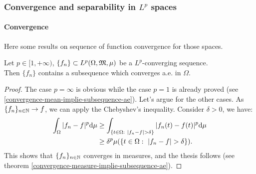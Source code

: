 \subsubsection{Convergence and separability in \texorpdfstring{$L^p$}{Lp} spaces}


\paragraph{Convergence} Here some results on sequence of function convergence for those spaces.

\begin{prop}
	Let $p \in [1, +\infty)$, $\{f_n\} \subset L^p(\Omega,\mathfrak M,\mu)$ be a $L^p$-converging sequence.\\
	Then $\{f_n\}$ contains a subsequence which converges a.e. in $\Omega$.
\end{prop}

\begin{proof} The case $p = \infty$ is obvious while the case $p=1$ is already proved (see \vref{convergence-mean-implie-subsequence-ae}). Let's argue for the other cases.
	As $\{f_n\}_{n \in \mathbb N} \to f$, we can apply the Chebyshev's inequality. Consider $\delta > 0$, we have:
	\begin{align*}
	\int_\Omega |f_n - f|^p \mathrm d \mu
	&\geq \int _{\{t \in \Omega:\ |f_n - f | > \delta\}} |f_n(t) - f(t)|^p \mathrm d \mu \\
	&\geq \delta^p \mu(\{t \in \Omega: \ |f_n - f| > \delta \}).
	\end{align*}
	This shows that $\{f_n\}_{n\in \mathbb N}$ converges in measures, and the thesis follows (see theorem \vref{convergence-measure-implie-subsequence-ae}).
\end{proof}

